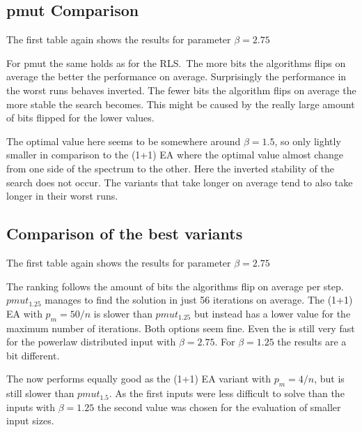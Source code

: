 \subsection{pmut Comparison}
The first table again shows the results for parameter $\beta=2.75$



For pmut the same holds as for the RLS.\
The more bits the algorithms flips on average the better the performance on average.
Surprisingly the performance in the worst runs behaves inverted.
The fewer bits the algorithm flips on average the more stable the search becomes.
This might be caused by the really large amount of bits flipped for the lower values.



The optimal value here seems to be somewhere around $\beta=1.5$, so only lightly smaller in comparison to the (1+1) EA where the optimal value almost change from one side of the spectrum to the other.
Here the inverted stability of the search does not occur.
The variants that take longer on average tend to also take longer in their worst runs.

\subsection{Comparison of the best variants}
The first table again shows the results for parameter $\beta=2.75$



The ranking follows the amount of bits the algorithms flip on average per step.
$pmut_{1.25}$ manages to find the solution in just 56 iterations on average.
The (1+1) EA with $p_m=50/n$ is slower than $pmut_{1.25}$ but instead has a lower value for the maximum number of iterations.
Both options seem fine.
Even the \RLSN[4] is still very fast for the powerlaw distributed input with $\beta = 2.75$.
For $\beta = 1.25$ the results are a bit different.



The \RLSR[4] now performs equally good as the (1+1) EA variant with $p_m=4/n$, but is still slower than $pmut_{1.5}$.
As the first inputs were less difficult to solve than the inputs with $\beta = 1.25$ the second value was chosen for the evaluation of smaller input sizes.



